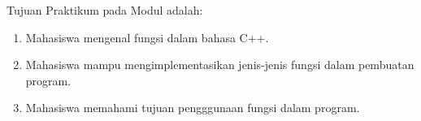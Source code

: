 \documentclass[../main.tex]{subfiles}
\begin{document}
    \noindent Tujuan Praktikum pada Modul {} {\leftmark} adalah:
    \begin{enumerate}
        \item{Mahasiswa mengenal fungsi dalam bahasa C++.}
        \item{Mahasiswa mampu mengimplementasikan jenis-jenis fungsi dalam pembuatan program.}
        \item{Mahasiswa memahami tujuan pengggunaan fungsi dalam program.}
    \end{enumerate}
\end{document}
